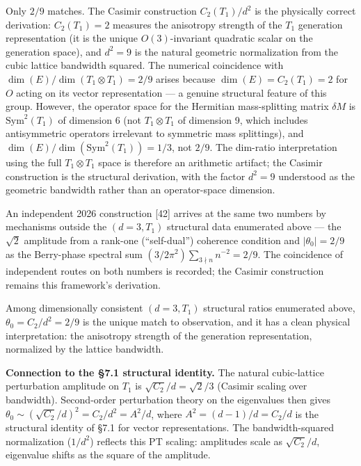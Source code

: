 \documentclass[
]{article}
\begin{document}
Only \(2/9\) matches. The Casimir construction \(C_2(T_1)/d^2\) is the
physically correct derivation: \(C_2(T_1) = 2\) measures the anisotropy
strength of the \(T_1\) generation representation (it is the unique
\(O(3)\)-invariant quadratic scalar on the generation space), and
\(d^2 = 9\) is the natural geometric normalization from the cubic
lattice bandwidth squared. The numerical coincidence with
\(\dim(E)/\dim(T_1 \otimes T_1) = 2/9\) arises because
\(\dim(E) = C_2(T_1) = 2\) for \(O\) acting on its vector representation
--- a genuine structural feature of this group. However, the operator
space for the Hermitian mass-splitting matrix \(\delta M\) is
\(\text{Sym}^2(T_1)\) of dimension 6 (not \(T_1 \otimes T_1\) of
dimension 9, which includes antisymmetric operators irrelevant to
symmetric mass splittings), and
\(\dim(E)/\dim(\text{Sym}^2(T_1)) = 1/3\), not \(2/9\). The dim-ratio
interpretation using the full \(T_1 \otimes T_1\) space is therefore an
arithmetic artifact; the Casimir construction is the structural
derivation, with the factor \(d^2 = 9\) understood as the geometric
bandwidth rather than an operator-space dimension.

An independent 2026 construction {[}42{]} arrives at the same two
numbers by mechanisms outside the \((d = 3, T_1)\) structural data
enumerated above --- the \(\sqrt{2}\) amplitude from a rank-one
(``self-dual'') coherence condition and \(|\theta_0| = 2/9\) as the
Berry-phase spectral sum \((3/2\pi^2)\sum_{3\nmid n} n^{-2} = 2/9\). The
coincidence of independent routes on both numbers is recorded; the
Casimir construction remains this framework's derivation.

Among dimensionally consistent \((d=3, T_1)\) structural ratios
enumerated above, \(\theta_0 = C_2/d^2 = 2/9\) is the unique match to
observation, and it has a clean physical interpretation: the anisotropy
strength of the generation representation, normalized by the lattice
bandwidth.

\textbf{Connection to the §7.1 structural identity.} The natural
cubic-lattice perturbation amplitude on \(T_1\) is
\(\sqrt{C_2}/d = \sqrt{2}/3\) (Casimir scaling over bandwidth).
Second-order perturbation theory on the eigenvalues then gives
\(\theta_0 \sim (\sqrt{C_2}/d)^2 = C_2/d^2 = A^2/d\), where
\(A^2 = (d-1)/d = C_2/d\) is the structural identity of §7.1 for vector
representations. The bandwidth-squared normalization (\(1/d^2\))
reflects this PT scaling: amplitudes scale as \(\sqrt{C_2}/d\),
eigenvalue shifts as the square of the amplitude.
\end{document}

